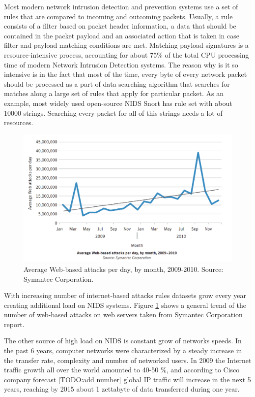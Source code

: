 \documentclass[thesis=M,english]{FITthesis}[2011/07/15]
\begin{document}
Most modern network intrusion detection and prevention systems use a set of rules that are compared to incoming and outcoming packets. Usually, a rule consists of a filter based on packet header information, a data that should be contained in the packet payload and an associated action that is taken in case filter and payload matching conditions are met.
Matching payload signatures is a resource-intensive process, accounting for about 75\% of the total CPU processing time of modern Network Intrusion Detection systems. The reason why is it so intensive is in the fact that most of the time, every byte of every network packet should be processed as a part of data searching algorithm that searches for matches along a large set of rules that apply for particular packet. As an example, most widely used open-source NIDS Snort has rule set with about 10000 strings. Searching every packet for all of this strings needs a lot of resources. 
\begin{figure}[h]
\centering
\includegraphics[scale=0.3]{images/web-attacks.png}
\caption{Average Web-based attacks per day, by month, 2009-2010. Source: Symantec Corporation.}
\label{fig:symantec_report}
\end{figure}
With increasing number of internet-based attacks rules datasets grow every year creating additional load on NIDS systems. Figure \ref{fig:symantec_report} shows a general trend of the number of web-based attacks on web servers taken from Symantec Corporation report.

The other source of high load on NIDS is constant grow of networks speeds. In the past 6 years, computer networks were characterized by a steady increase in the transfer rate, complexity and number of networked users. In 2009 the Internet traffic growth all over the world amounted to 40-50 \%, and according to Cisco company forecast [TODO:add number] global IP traffic will increase in the next 5 years, reaching by 2015 about 1 zettabyte of data transferred during one year.
\end{document}
